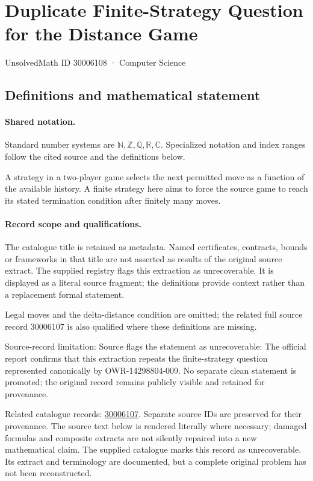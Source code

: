 \documentclass[11pt]{article}
\begin{document}
\setcounter{section}{30006107}
\section{Duplicate Finite-Strategy Question for the Distance Game}\label{30006108}
{\small\sffamily UnsolvedMath ID 30006108 · Computer Science}
\subsection{Definitions and mathematical statement}

\paragraph{Shared notation.}Standard number systems are $\mathbb N,\mathbb Z,\mathbb Q,\mathbb R,\mathbb C$. Specialized notation and index ranges follow the cited source and the definitions below.


A strategy in a two-player game selects the next permitted move as a function of the available history. A finite strategy here aims to force the source game to reach its stated termination condition after finitely many moves.
\paragraph{Record scope and qualifications.}
The catalogue title is retained as metadata. Named certificates, contracts, bounds or frameworks in that title are not asserted as results of the original source extract.
The supplied registry flags this extraction as unrecoverable. It is displayed as a literal source fragment; the definitions provide context rather than a replacement formal statement.

Legal moves and the delta-distance condition are omitted; the related full source record 30006107 is also qualified where these definitions are missing.

Source-record limitation: Source flags the statement as unrecoverable: The official report confirms that this extraction repeats the finite-strategy question represented canonically by OWR-14298804-009. No separate clean statement is promoted; the original record remains publicly visible and retained for provenance.

Related catalogue records: \href{https://mehmetmars7.github.io/Erdosproblems-llm-hunter/problem.html?type=open_problems&id=30006107}{30006107}. Separate source IDs are preserved for their provenance.
The source text below is rendered literally where necessary; damaged formulas and composite extracts are not silently repaired into a new mathematical claim.
The supplied catalogue marks this record as unrecoverable. Its extract and terminology are documented, but a complete original problem has not been reconstructed.
\end{document}
